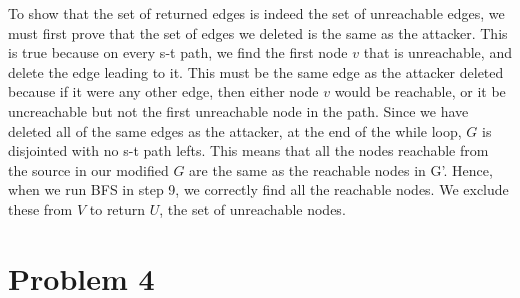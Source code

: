 \documentclass{article}
\begin{document}
To show that the set of returned edges is indeed the set of unreachable edges,
we must first prove that the set of edges we deleted is the same as the
attacker. This is true because on every s-t path, we find the first node $v$ that
is unreachable, and delete the edge leading to it. This must be the same edge
as the attacker deleted because if it were any other edge, then either node $v$
would be reachable, or it be uncreachable but not the first unreachable node in
the path. Since we have deleted all of the same edges as the attacker, at the
end of the while loop, $G$ is disjointed with no s-t path lefts. This means that
all the nodes reachable from the source in our modified $G$ are the same as the
reachable nodes in G'.  Hence, when we run BFS in step 9, we correctly find all
the reachable nodes. We exclude these from $V$ to return $U$, the set of
unreachable nodes.

\section*{Problem 4}
\end{document}
